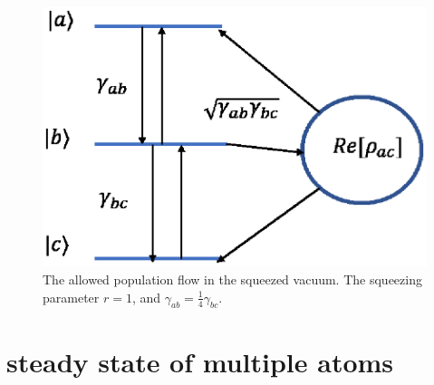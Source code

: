 \documentclass[aps,showpacs,twocolumn,twoside,groupedaddress]{revtex4}
\begin{document}
\begin{figure}
\includegraphics[width=0.9\columnwidth]{atom_fig3.eps}
\caption{ The allowed population flow in the squeezed vacuum. The squeezing parameter $r=1$, and $\gamma_{ab}=\frac{1}{4}\gamma_{bc}$.}
\label{2c}
\end{figure}

\section{steady state of multiple atoms}
\end{document}
